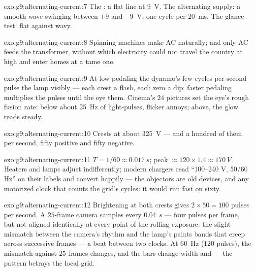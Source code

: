 \begin{solution}{exo:g9:alternating-current:7}
The : a flat line at \qty{9}{V}. The alternating
supply: a smooth wave swinging between $+9$ and
\qty{-9}{V}, one cycle per \qty{20}{ms}. The glance-test:
flat against wavy.
\end{solution}

\begin{solution}{exo:g9:alternating-current:8}
Spinning machines make AC naturally; and only AC feeds the
transformer, without which electricity could not travel the
country at high  and enter homes at a tame one.
\end{solution}

\begin{solution}{exo:g9:alternating-current:9}
At low pedaling the dynamo's few cycles per second pulse the
lamp visibly --- each crest a flash, each zero a dip; faster
pedaling multiplies the pulses until the eye  them.
Cinema's $24$ pictures set the eye's rough fusion rate: below
about \qty{25}{Hz} of light-pulses, flicker annoys; above,
the glow reads steady.
\end{solution}

\begin{solution}{exo:g9:alternating-current:10}
Crests at about \qty{325}{V} --- and a hundred of them per
second, fifty positive and fifty negative.
\end{solution}

\begin{solution}{exo:g9:alternating-current:11}
$T = 1/60 \approx \qty{0.017}{s}$; peak $\approx 120 \times
1.4 \approx \qty{170}{V}$. Heaters and lamps adjust
indifferently; modern chargers read ``100--240 V, 50/60 Hz''
on their labels and convert happily --- the objectors are
old  devices, and any motorized clock that
counts the grid's cycles: it would run fast on sixty.
\end{solution}

\begin{solution}{exo:g9:alternating-current:12}
Brightening at both crests gives $2 \times 50 = 100$ pulses
per second. A $25$-frame camera samples every
\qty{0.04}{s} --- four pulses per frame, but not aligned
identically at every point of the rolling exposure: the
slight mismatch between the camera's rhythm and the lamp's
paints bands that creep across successive frames --- a beat
between two clocks. At \qty{60}{Hz} ($120$ pulses), the
mismatch against $25$ frames changes, and the bars change
width and  --- the pattern betrays the local grid.
\end{solution}

